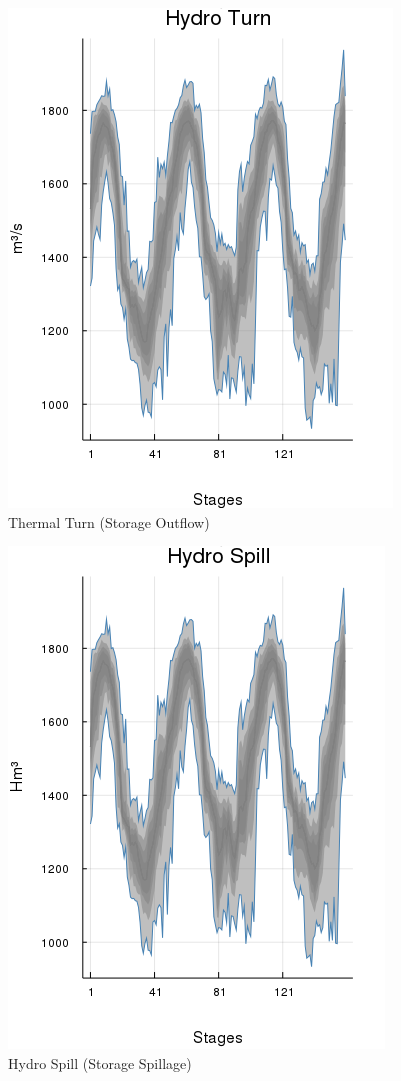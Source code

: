 \documentclass{juliacon}
\begin{document}
\begin{figure}[H]
\centerline{\includegraphics[width=0.55\linewidth]{fig/plot_agg_result_hydroturn.png}}
\caption{Thermal Turn (Storage Outflow)}
\label{fig:plot_agg_result_hydroturn}
\end{figure}

\begin{figure}[H]
\centerline{\includegraphics[width=0.5\linewidth]{fig/plot_agg_result_hydrospill.png}}
\caption{Hydro Spill (Storage Spillage)}
\label{fig:plot_agg_result_hydrospill}
\end{figure}
\end{document}
